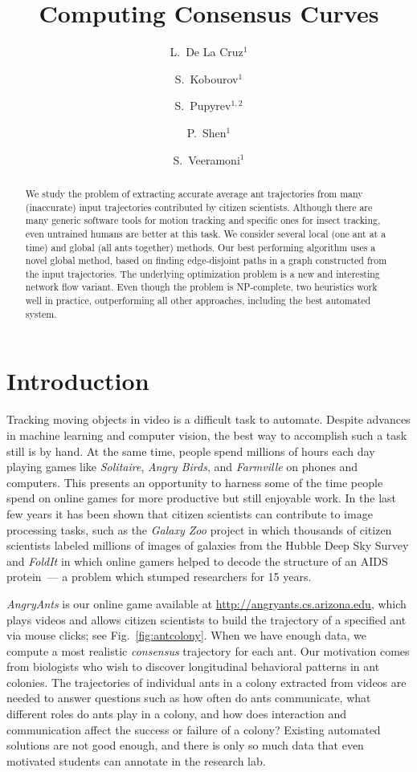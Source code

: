 \documentclass{llncs}
\author{
L.~De La Cruz$^1$ \and
S.~Kobourov$^1$ \and
S.~Pupyrev$^{1,2}$ \and
P.~Shen$^1$ \and
S.~Veeramoni$^{1}$
}
\institute{
$^1$ Department of Computer Science, University of Arizona\\
$^2$ Institute of Mathematics and Computer Science, Ural Federal University
}
\title{Computing Consensus Curves}
\begin{document}
\maketitle

\begin{abstract}
We study the problem of extracting accurate average ant
trajectories from many (inaccurate) input trajectories
contributed by citizen scientists. Although there are many generic
software tools for motion tracking and specific ones for insect
tracking, even untrained humans are better at this task.
We consider several local (one ant at a time) and global (all ants
together) methods. Our best performing algorithm uses a novel global
method, based on finding edge-disjoint paths in a graph constructed from
the input trajectories. The underlying optimization problem is a new
and interesting network flow variant.
Even though the problem is NP-complete, two heuristics work well in practice,
outperforming all other approaches,
including the best automated system.
\end{abstract}


\section{Introduction}
\label{sec:intro}
Tracking moving objects in video is a difficult task to automate. Despite advances in
machine learning and computer vision, the best way to accomplish such
a task still is by hand. At the same time, people spend millions of hours each day
playing games like \emph{Solitaire}, \emph{Angry Birds}, and \emph{Farmville} on phones and
computers. This presents
an opportunity to harness some of the time people spend on online
games for more productive but still
enjoyable work.
In the last few years it has been shown that citizen
scientists can contribute to image processing tasks, such as the
\emph{Galaxy Zoo} project in which thousands of citizen
scientists labeled millions of images of galaxies from
the Hubble Deep Sky Survey and \emph{FoldIt} in
which online gamers helped to decode the structure of an AIDS protein~---
a problem which stumped researchers for 15 years.

\emph{AngryAnts} is our online game available at \url{http://angryants.cs.arizona.edu},
which plays videos and allows citizen scientists to build the
trajectory of a specified ant via mouse clicks;
see Fig.~\ref{fig:antcolony}.
When we have enough data, we compute a
most realistic {\em consensus} trajectory for each ant.
Our motivation comes from biologists who wish to discover
longitudinal behavioral patterns in ant colonies.
The trajectories of individual ants in a colony extracted from videos
are needed to answer
questions such as how often do ants communicate, what different roles
do ants play in a colony, and how does interaction and communication affect
the success or failure of a colony? Existing automated solutions are
not good enough, and there is
only so much data that even motivated students can annotate in the
research lab.
\end{document}
